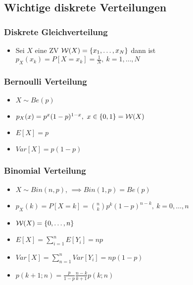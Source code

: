 \subsection{Wichtige diskrete Verteilungen}
\subsubsection{Diskrete Gleichverteilung}
\begin{itemize}
    \item Sei $X$ eine ZV $\mathcal{W}(X) = \{x_1, \dots, x_N\}$ dann ist $p_X(x_k) = P[X = x_k] = \frac{1}{N}, \ k = 1,\dots, N$
\end{itemize}

\subsubsection{Bernoulli Verteilung}
\begin{itemize}
    \item $X \sim Be(p)$
    \item $p_X(x) = p^x(1-p)^{1-x}, \ x \in \{0,1\} = \mathcal{W}(X)$
    \item $E[X] = p$
    \item $Var[X] = p(1 - p)$
\end{itemize}

\subsubsection{Binomial Verteilung}
\begin{itemize}
    \item $X \sim Bin(n, p)$, $\implies Bin(1, p) = Be(p)$
    \item $p_X(k) = P[X = k] = {n\choose k} p^k (1 - p)^{n - k}, \ k = 0, \dots, n$
    \item $\mathcal{W}(X) = \{0, \dots, n\}$
    \item $E[X] = \sum_{i=1}^{n} E[Y_i] = np$
    \item $Var[X] = \sum_{n=1}^{n} Var[Y_i] = np(1 - p)$
    \item $p(k + 1; n) = \frac{p}{1 - p}\frac{n - k}{k + 1} p(k; n)$
\end{itemize}


